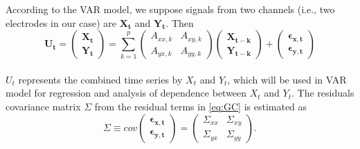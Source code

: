 According to the VAR model, we suppose signals from two channels (i.e., two electrodes in our case) are $\mathbf{X_t}$ and $\mathbf{Y_t}$. Then
\begin{equation} \label{eq:GC}
\mathbf{U_t} =  \begin{pmatrix}
                  \mathbf{X_t}\\
                  \mathbf{Y_t}
                \end{pmatrix} = \sum_{k=1}^{p} \begin{pmatrix}
                                                  A_{xx,k} & A_{xy,k}\\
                                                  A_{yx,k} & A_{yy,k}
                                                \end{pmatrix} \begin{pmatrix}
                                                              \mathbf{X_{t-k}}\\
                                                              \mathbf{Y_{t-k}}
                                                                    \end{pmatrix} + \begin{pmatrix}
                                                                                      \mathbf{\epsilon_{x,t}}\\
                                                                                      \mathbf{\epsilon_{y,t}}
                                                                                    \end{pmatrix}
\end{equation}
\\
$U_t$ represents the combined time series by $X_t$ and $Y_t$, which will be used in VAR model for regression and analysis of dependence between $X_t$ and $Y_t$. The residuals covariance matrix $\Sigma$ from the residual terms in \eqref{eq:GC} is estimated as
\begin{equation}
\Sigma \equiv cov \begin{pmatrix}
                   \mathbf{\epsilon_{x,t}}\\                                                                             \mathbf{\epsilon_{y,t}}
                  \end{pmatrix} = \begin{pmatrix}
                                   \Sigma_{xx} & \Sigma_{xy}\\                                                                           \Sigma_{yx} & \Sigma_{yy}
                                  \end{pmatrix}.
\end{equation}

